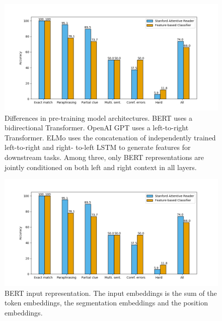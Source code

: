 

\begin{figure}[htb] %
	\centering
	\includegraphics[scale=0.6]{img/cnn_analysis.png} 	%
	\caption{Differences in pre-training model architectures. BERT uses a bidirectional Transformer. OpenAI GPT uses a left-to-right Transformer. ELMo uses the concatenation of independently trained left-to-right and right- to-left LSTM to generate features for downstream tasks. Among three, only BERT representations are jointly conditioned on both left and right context in all layers.}
	\label{fig1}
\end{figure}
	
\begin{figure}[htb] %
	\centering
	\includegraphics[scale=0.6]{img/cnn_analysis.png} 	%
	\caption{BERT input representation. The input embeddings is the sum of the token embeddings, the segmentation embeddings and the position embeddings.}
	\label{fig2}
\end{figure}

